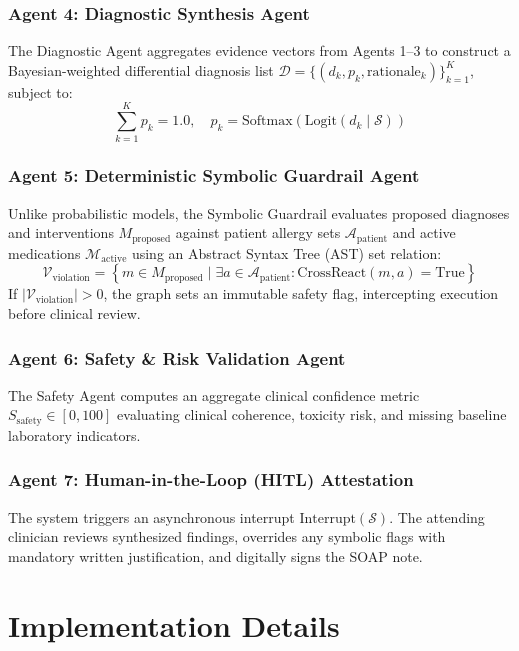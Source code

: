 \documentclass[conference]{IEEEtran}
\begin{document}
\subsubsection{Agent 4: Diagnostic Synthesis Agent}
The Diagnostic Agent aggregates evidence vectors from Agents 1--3 to construct a Bayesian-weighted differential diagnosis list $\mathcal{D} = \{(d_k, p_k, \text{rationale}_k)\}_{k=1}^K$, subject to:
\begin{equation}
\sum_{k=1}^K p_k = 1.0, \quad p_k = \text{Softmax}(\text{Logit}(d_k \mid \mathcal{S}))
\end{equation}

\subsubsection{Agent 5: Deterministic Symbolic Guardrail Agent}
Unlike probabilistic models, the Symbolic Guardrail evaluates proposed diagnoses and interventions $M_{\text{proposed}}$ against patient allergy sets $\mathcal{A}_{\text{patient}}$ and active medications $\mathcal{M}_{\text{active}}$ using an Abstract Syntax Tree (AST) set relation:
\begin{equation}
\mathcal{V}_{\text{violation}} = \left\{ m \in M_{\text{proposed}} \mid \exists a \in \mathcal{A}_{\text{patient}} : \text{CrossReact}(m, a) = \text{True} \right\}
\end{equation}
If $|\mathcal{V}_{\text{violation}}| > 0$, the graph sets an immutable safety flag, intercepting execution before clinical review.

\subsubsection{Agent 6: Safety \& Risk Validation Agent}
The Safety Agent computes an aggregate clinical confidence metric $S_{\text{safety}} \in [0, 100]$ evaluating clinical coherence, toxicity risk, and missing baseline laboratory indicators.

\subsubsection{Agent 7: Human-in-the-Loop (HITL) Attestation}
The system triggers an asynchronous interrupt $\text{Interrupt}(\mathcal{S})$. The attending clinician reviews synthesized findings, overrides any symbolic flags with mandatory written justification, and digitally signs the SOAP note.

\section{Implementation Details}
\end{document}
